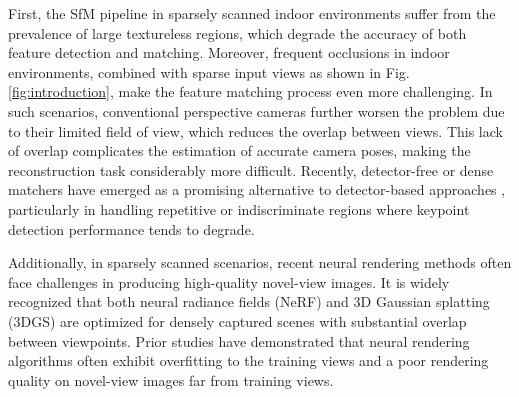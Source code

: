 First, the SfM pipeline in sparsely scanned indoor environments suffer from the prevalence of large textureless regions, which degrade the accuracy of both feature detection and matching. Moreover, frequent occlusions in indoor environments, combined with sparse input views as shown in Fig. \ref{fig:introduction}, make the feature matching process even more challenging. In such scenarios, conventional perspective cameras further worsen the problem due to their limited field of view, which reduces the overlap between views. This lack of overlap complicates the estimation of accurate camera poses, making the reconstruction task considerably more difficult. Recently, detector-free or dense matchers \cite{sun2021loftr,melekhov2019dgc,truong2020glu,truong2021learning,edstedt2023dkm,edstedt2024roma} have emerged as a promising alternative to detector-based approaches \cite{detone2018superpoint,revaud2019r2d2,tyszkiewicz2020disk}, particularly in handling repetitive or indiscriminate regions where keypoint detection performance tends to degrade.

Additionally, in sparsely scanned scenarios, recent neural rendering methods \cite{mildenhall2021nerf,kerbl20233d} often face challenges in producing high-quality novel-view images. It is widely recognized that both neural radiance fields (NeRF) \cite{mildenhall2021nerf} and 3D Gaussian splatting (3DGS) \cite{kerbl20233d} are optimized for densely captured scenes with substantial overlap between viewpoints. Prior studies \cite{xiong2023sparsegs,wang2023sparsenerf,martins2024feature,lee2024modegs} have demonstrated that neural rendering algorithms often exhibit overfitting to the training views and a poor rendering quality on novel-view images far from training views.


